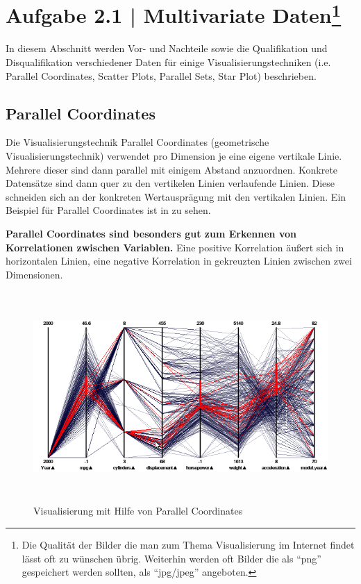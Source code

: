\documentclass[a4paper,12pt,ngerman]{scrartcl}
\begin{document}
\pagestyle{fancy} %

\section{Aufgabe 2.1 | Multivariate Daten\footnote{\scriptsize{Die Qualität der Bilder die man zum Thema Visualisierung im Internet findet lässt oft zu wünschen übrig. Weiterhin werden oft Bilder die als \enquote{png} gespeichert werden sollten, als \enquote{jpg/jpeg} angeboten.}}}
In diesem Abschnitt werden Vor- und Nachteile sowie die Qualifikation und Disqualifikation verschiedener Daten für einige Visualisierungstechniken (i.e. Parallel Coordinates, Scatter Plots, Parallel Sets, Star Plot) beschrieben.

\subsection*{Parallel Coordinates}
Die Visualisierungstechnik Parallel Coordinates (geometrische Visualisierungstechnik) verwendet pro Dimension je eine eigene vertikale Linie. Mehrere dieser sind dann parallel mit einigem Abstand anzuordnen. Konkrete Datensätze sind dann quer zu den vertikelen Linien verlaufende Linien. Diese schneiden sich an der konkreten Wertausprägung mit den vertikalen Linien. Ein Beispiel für Parallel Coordinates ist in  zu sehen.

\textbf{Parallel Coordinates sind besonders gut zum Erkennen von Korrelationen zwischen Variablen.} Eine positive Korrelation äußert sich in horizontalen Linien, eine negative Korrelation in gekreuzten Linien zwischen zwei Dimensionen.

\begin{figure}[ht]
    \centering
    \includegraphics[height=8cm]{includes/parallel-coordinates}
    \caption{Visualisierung mit Hilfe von Parallel Coordinates}
    \label{fig:parallel-coordinates}
\end{figure}
\end{document}
